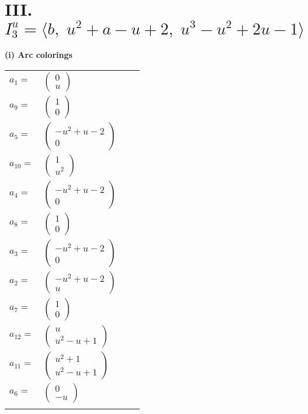 \documentclass[1p]{elsarticle_modified}
\theoremstyle{definition}
\begin{document}
\centering \section*{III. $I^u_{3}= \langle b,\;u^2+a- u+2,\;u^3- u^2+2 u-1 \rangle$}
\flushleft \textbf{(i) Arc colorings}\\
\begin{tabular}{m{7pt} m{180pt} m{7pt} m{180pt} }
\flushright $a_{1}=$&$\begin{pmatrix}0\\u\end{pmatrix}$ \\
\flushright $a_{9}=$&$\begin{pmatrix}1\\0\end{pmatrix}$ \\
\flushright $a_{5}=$&$\begin{pmatrix}- u^2+u-2\\0\end{pmatrix}$ \\
\flushright $a_{10}=$&$\begin{pmatrix}1\\u^2\end{pmatrix}$ \\
\flushright $a_{4}=$&$\begin{pmatrix}- u^2+u-2\\0\end{pmatrix}$ \\
\flushright $a_{8}=$&$\begin{pmatrix}1\\0\end{pmatrix}$ \\
\flushright $a_{3}=$&$\begin{pmatrix}- u^2+u-2\\0\end{pmatrix}$ \\
\flushright $a_{2}=$&$\begin{pmatrix}- u^2+u-2\\u\end{pmatrix}$ \\
\flushright $a_{7}=$&$\begin{pmatrix}1\\0\end{pmatrix}$ \\
\flushright $a_{12}=$&$\begin{pmatrix}u\\u^2- u+1\end{pmatrix}$ \\
\flushright $a_{11}=$&$\begin{pmatrix}u^2+1\\u^2- u+1\end{pmatrix}$ \\
\flushright $a_{6}=$&$\begin{pmatrix}0\\- u\end{pmatrix}$\\&\end{tabular}
\end{document}
